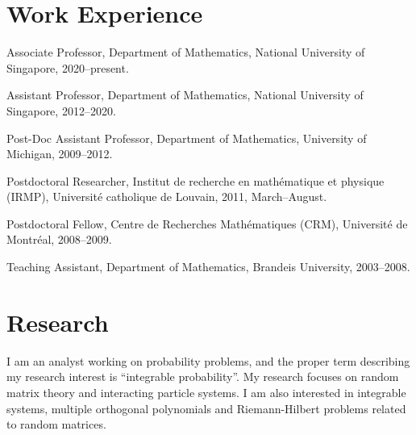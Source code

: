 \section*{Work Experience }

\begin{item_list}
\item
  Associate Professor, Department of Mathematics, National University of Singapore, 2020--present. \cn{\\}
\item
  Assistant Professor, Department of Mathematics, National University of Singapore, 2012--2020. \cn{\\}
\item
  Post-Doc Assistant Professor, Department of Mathematics, University of Michigan,
  2009--2012. \cn{\\}
\item
  Postdoctoral Researcher, Institut de recherche en math\'{e}matique et physique (IRMP), Universit\'{e} catholique de Louvain, 2011, March--August. \cn{\\}
\item
  Postdoctoral Fellow, Centre de Recherches Math\'{e}matiques (CRM), Universit\'{e} de Montr\'{e}al, 2008--2009. \cn{\\}
\item
  Teaching Assistant, Department of Mathematics, Brandeis University, 2003--2008. \cn{\\}
\end{item_list}

\section*{Research }

I am an analyst working on probability problems, and the proper term describing my research interest is ``integrable probability''. My research focuses on random matrix theory and interacting particle systems. I am also interested in integrable systems, multiple orthogonal polynomials and Riemann-Hilbert problems related to random matrices.


